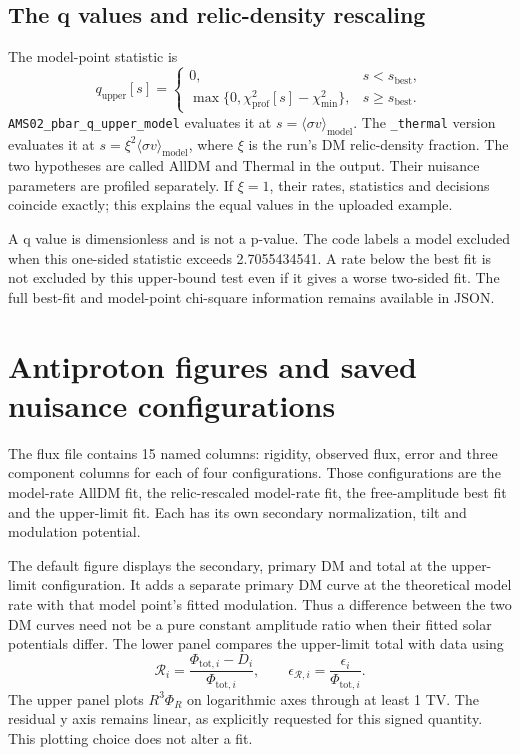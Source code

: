 \documentclass[11pt,a4paper]{article}
\newcommand{\sv}{\langle\sigma v\rangle}
\begin{document}
\subsection{The q values and relic-density rescaling}
The model-point statistic is
\begin{equation}
q_{\mathrm{upper}}[s]=
\begin{cases}
0,& s<s_{\mathrm{best}},\\
\max\{0,\chi^2_{\mathrm{prof}}[s]-\chi^2_{\mathrm{min}}\},&s\geq s_{\mathrm{best}}.
\end{cases}
\end{equation}
\texttt{AMS02\_pbar\_q\_upper\_model} evaluates it at $s=\sv_{\mathrm{model}}$. The \texttt{\_thermal} version evaluates it at $s=\xi^2\sv_{\mathrm{model}}$, where $\xi$ is the run's DM relic-density fraction. The two hypotheses are called AllDM and Thermal in the output. Their nuisance parameters are profiled separately. If $\xi=1$, their rates, statistics and decisions coincide exactly; this explains the equal values in the uploaded example.

A q value is dimensionless and is not a p-value. The code labels a model excluded when this one-sided statistic exceeds 2.7055434541. A rate below the best fit is not excluded by this upper-bound test even if it gives a worse two-sided fit. The full best-fit and model-point chi-square information remains available in JSON.

\section{Antiproton figures and saved nuisance configurations}
The flux file contains 15 named columns: rigidity, observed flux, error and three component columns for each of four configurations. Those configurations are the model-rate AllDM fit, the relic-rescaled model-rate fit, the free-amplitude best fit and the upper-limit fit. Each has its own secondary normalization, tilt and modulation potential.

The default figure displays the secondary, primary DM and total at the upper-limit configuration. It adds a separate primary DM curve at the theoretical model rate with that model point's fitted modulation. Thus a difference between the two DM curves need not be a pure constant amplitude ratio when their fitted solar potentials differ. The lower panel compares the upper-limit total with data using
\begin{equation}
\mathcal R_i=\frac{\Phi_{\mathrm{tot},i}-D_i}{\Phi_{\mathrm{tot},i}},\qquad
\epsilon_{\mathcal R,i}=\frac{\epsilon_i}{\Phi_{\mathrm{tot},i}}.
\end{equation}
The upper panel plots $R^3\Phi_R$ on logarithmic axes through at least 1 TV. The residual y axis remains linear, as explicitly requested for this signed quantity. This plotting choice does not alter a fit.
\end{document}
